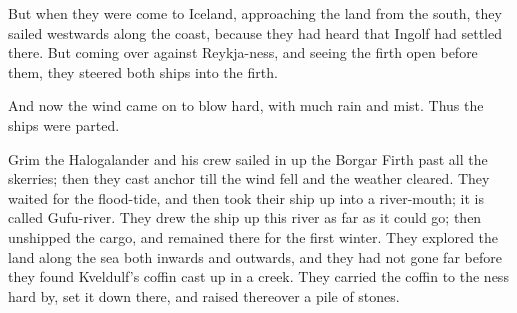But when they were come to Iceland, approaching the land from the south, they sailed westwards along the coast, because they had heard that Ingolf had settled there. But coming over against Reykja-ness, and seeing the firth open before them, they steered both ships into the firth.

And now the wind came on to blow hard, with much rain and mist. Thus the ships were parted.

Grim the Halogalander and his crew sailed in up the Borgar Firth past all the skerries; then they cast anchor till the wind fell and the weather cleared. They waited for the flood-tide, and then took their ship up into a river-mouth; it is called Gufu-river. They drew the ship up this river as far as it could go; then unshipped the cargo, and remained there for the first winter. They explored the land along the sea both inwards and outwards, and they had not gone far before they found Kveldulf's coffin cast up in a creek. They carried the coffin to the ness hard by, set it down there, and raised thereover a pile of stones.
